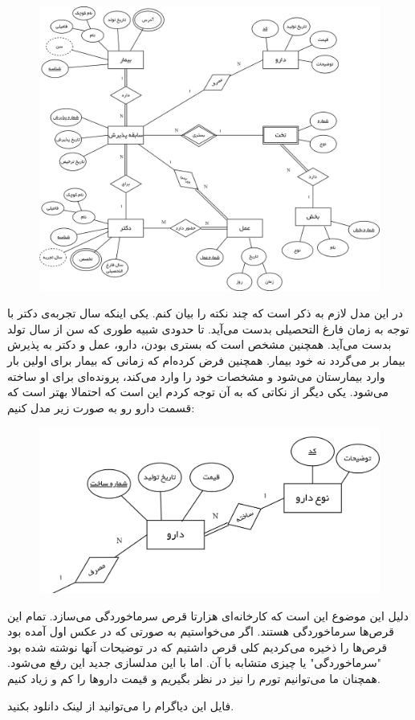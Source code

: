 \begin{figure}[H]
    \centering \includegraphics[scale=0.17]{pics/Hospital-ER.png}
\end{figure}
\noindent
در این مدل لازم به ذکر است که چند نکته را بیان کنم.
یکی اینکه سال تجربه‌ی دکتر با توجه به زمان فارغ التحصیلی بدست می‌آید. تا حدودی شبیه طوری که سن
از سال تولد بدست می‌آید.
همچنین مشخص است که بستری بودن، دارو، عمل و دکتر به پذیرش بیمار بر می‌گردد نه خود بیمار. همچنین فرض کرده‌ام
که زمانی که بیمار برای اولین بار وارد بیمارستان می‌شود و مشخصات خود را وارد می‌کند، پرونده‌ای برای او ساخته می‌شود.
یکی دیگر از نکاتی که به آن توجه کردم این است که احتمالا بهتر است که قسمت دارو رو به صورت زیر مدل کنیم:
\begin{figure}[H]
    \centering \includegraphics[scale=0.3]{pics/HospitalER-ER-Fixed.png}
\end{figure}
\noindent
دلیل این موضوع این است که کارخانه‌ای هزارتا قرص سرماخوردگی می‌سازد. تمام این قرص‌ها سرماخوردگی هستند.
اگر می‌خواستیم به صورتی که در عکس اول آمده بود قرص‌ها را ذخیره می‌کردیم کلی قرص داشتیم که در توضیحات
آنها نوشته شده بود
"سرماخوردگی"
یا چیزی متشابه با آن.
اما با این مدلسازی جدید این
رفع می‌شود. همچنان ما می‌توانیم تورم را نیز در نظر بگیریم و قیمت دارو‌ها را کم و زیاد کنیم.

\noindent
فایل
این دیاگرام را می‌توانید از
لینک دانلود بکنید.